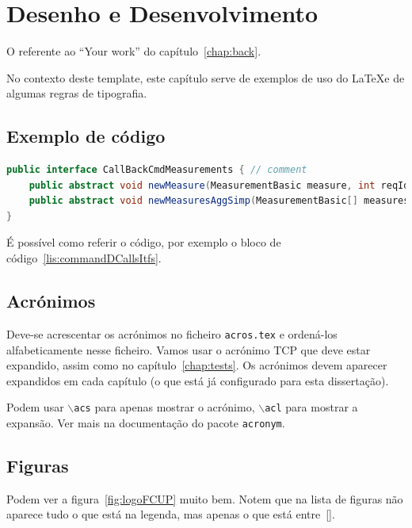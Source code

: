 \chapter{Desenho e Desenvolvimento}\label{chap:devel}

O referente ao ``Your work'' do capítulo~\ref{chap:back}.

No contexto deste template, este capítulo serve de exemplos de uso do \LaTeX e de algumas regras de tipografia.

\section{Exemplo de código}

\begin{lstlisting}[numbers=none,language=java,caption={[CommandDaemonCallsItf]
   {CommandDaemon} callback interfaces},label=lis:commandDCallsItfs,float=htb]
public interface CallBackCmdMeasurements { // comment
	public abstract void newMeasure(MeasurementBasic measure, int reqId);
	public abstract void newMeasuresAggSimp(MeasurementBasic[] measuresAggSimp, 'A string');
}
\end{lstlisting}

É possível como referir o código, por exemplo o bloco de código~\ref{lis:commandDCallsItfs}.

\section{Acrónimos}

Deve-se acrescentar os acrónimos no ficheiro \texttt{acros.tex} e ordená-los alfabeticamente nesse ficheiro.
Vamos usar o acrónimo \ac{TCP} que deve estar expandido, assim como no capítulo~\ref{chap:tests}. Os acrónimos devem aparecer expandidos em cada capítulo (o que está já configurado para esta dissertação).

Podem usar $\backslash$\texttt{acs} para apenas mostrar o acrónimo, $\backslash$\texttt{acl} para mostrar a expansão. Ver mais na documentação do pacote \texttt{acronym}.

\section{Figuras}

Podem ver a figura~\ref{fig:logoFCUP} muito bem. Notem que na lista de figuras não aparece tudo o que está na legenda, mas apenas o que está entre~[].

